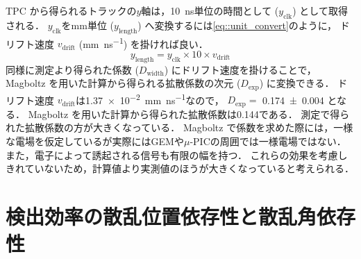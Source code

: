 \documentclass[../master]{subfiles}
\begin{document}
TPC から得られるトラックの$y$軸は，\SI{10}{\nano\second}単位の時間として ($y_{\text{clk}}$) として取得される．
$y_{\text{clk}}$を\si{\milli\metre}単位 ($y_{\text{length}}$) へ変換するには\eqref{eq::unit_convert}のように，
ドリフト速度 $v_{\text{drift}}$ (\si{\milli\metre\per\nano\second}) を掛ければ良い．
\begin{equation}
  y_{\text{length}} = y_{\text{clk}}\times 10\times v_{\text{drift}} \label{eq::unit_convert}
\end{equation}
同様に測定より得られた係数 ($D_{\text{width}}$) にドリフト速度を掛けることで，
Magboltz を用いた計算から得られる拡散係数の次元 ($D_{\text{exp}}$) に変換できる．
ドリフト速度 $v_{\text{drift}}$は\SI{1.37e-2}{\milli\metre\per\nano\second}なので，
$D_{\text{exp}} = $%
\SI{0.174\pm0.004}{\sqrt{\milli\metre}}
となる．
Magboltz を用いた計算から得られた拡散係数は\SI{0.144}{\sqrt{\milli\metre}}である．
測定で得られた拡散係数の方が大きくなっている．
Magboltz で係数を求めた際には，一様な電場を仮定しているが実際にはGEMや$\mu$-PICの周囲では一様電場ではない．
また，電子によって誘起される信号も有限の幅を持つ．
これらの効果を考慮しきれていないため，計算値より実測値のほうが大きくなっていると考えられる．

\section{検出効率の散乱位置依存性と散乱角依存性}
\end{document}
